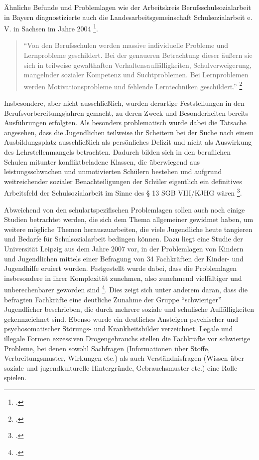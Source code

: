 Ähnliche Befunde und Problemlagen wie der Arbeitskreis Berufsschulsozialarbeit in Bayern diagnostizierte auch die Landesarbeitsgemeinschaft Schulsozialarbeit e. V. in Sachsen im Jahre 2004 \footcite[18]{LSS2004}. 

\begin{quotation}
\noindent
"`Von den Berufsschulen werden massive individuelle Probleme und Lernprobleme geschildert. Bei der genaueren Betrachtung dieser äußern sie sich in teilweise gewalthaften Verhaltensauffälligkeiten, Schulverweigerung, mangelnder sozialer Kompetenz und Suchtproblemen. Bei Lernproblemen werden Motivationsprobleme und fehlende Lerntechniken geschildert."' \footcite[18]{LSS2004}
\end{quotation}

\noindent
Insbesondere, aber nicht ausschließlich, wurden derartige Feststellungen in den Berufsvorbereitungsjahren gemacht, zu deren Zweck und Besonderheiten bereits Ausführungen erfolgten. Als besonders problematisch wurde dabei die Tatsache angesehen, dass die Jugendlichen teilweise ihr Scheitern bei der Suche nach einem Ausbildungsplatz ausschließlich als persönliches Defizit und nicht als Auswirkung des Lehrstellenmangels betrachten. Dadurch bilden sich in den beruflichen Schulen mitunter konfliktbeladene Klassen, die überwiegend aus leistungsschwachen und unmotivierten Schülern bestehen und aufgrund weitreichender sozialer Benachteiligungen der Schüler eigentlich ein definitives Arbeitsfeld der Schulsozialarbeit im Sinne des § 13 SGB VIII/KJHG wären \footcite[18]{LSS2004}.

Abweichend von den schulartspezifischen Problemlagen sollen auch noch einige Studien betrachtet werden, die sich dem Thema allgemeiner gewidmet haben, um weitere mögliche Themen herauszuarbeiten, die viele Jugendliche heute tangieren und Bedarfe für Schulsozialarbeit bedingen können. Dazu liegt eine Studie der Universität Leipzig aus dem Jahre 2007 vor, in der Problemlagen von Kindern und Jugendlichen mittels einer Befragung von 34 Fachkräften der Kinder- und Jugendhilfe eruiert wurden. Festgestellt wurde dabei, dass die Problemlagen insbesondere in ihrer Komplexität zunehmen, also zunehmend vielfältiger und unberechenbarer geworden sind \footcite[vgl.][142ff]{UniversitaetLeipzig2007}. Dies zeigt sich unter anderem daran, dass die befragten Fachkräfte eine deutliche Zunahme der Gruppe "`schwieriger"' Jugendlicher beschrieben, die durch mehrere soziale und schulische Auffälligkeiten gekennzeichnet sind. Ebenso wurde ein deutliches Ansteigen psychischer und psychosomatischer Störungs- und Krankheitsbilder verzeichnet. Legale und illegale Formen exzessiven Drogengebrauchs stellen die Fachkräfte vor schwierige Probleme, bei denen sowohl Sachfragen (Informationen über Stoffe, Verbreitungsmuster, Wirkungen etc.) als auch Verständnisfragen (Wissen über soziale und jugendkulturelle Hintergründe, Gebrauchsmuster etc.) eine Rolle spielen. 

